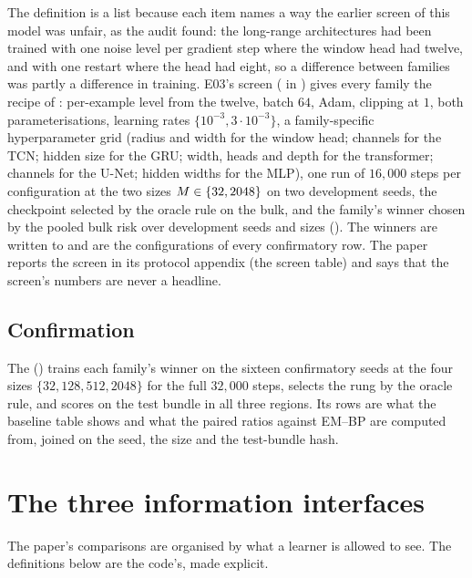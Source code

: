 The definition is a list because each item names a way the earlier screen of this
model was unfair, as the audit found: the long-range architectures had been trained with
one noise level per gradient step where the window head had twelve, and with one
restart where the head had eight, so a difference between families was partly a
difference in training. E03's screen ( in
) gives every family the recipe of
: per-example level from the twelve, batch $64$, Adam,
clipping at $1$, both parameterisations, learning rates $\{10^{-3},3\cdot10^{-3}\}$, a
family-specific hyperparameter grid (radius and width for the window head; channels for
the TCN; hidden size for the GRU; width, heads and depth for the transformer; channels
for the U-Net; hidden widths for the MLP), one run of $16{,}000$ steps per configuration
at the two sizes $M\in\{32,2048\}$ on two development seeds, the checkpoint selected
by the oracle rule on the bulk, and the family's winner chosen by the pooled bulk risk
over development seeds and sizes (). The winners are
written to  and are the configurations of every
confirmatory row. The paper reports the screen in its protocol appendix (the screen
table) and says that the screen's numbers are never a headline.

\subsection{Confirmation}

The  () trains each family's winner on the
sixteen confirmatory seeds at the four sizes $\{32,128,512,2048\}$ for the full
$32{,}000$ steps, selects the rung by the oracle rule, and scores on the test bundle in
all three regions. Its rows are what the baseline table shows and what the paired
ratios against EM--BP are computed from, joined on the seed, the size and the test-bundle
hash.

\section{The three information interfaces}
\label{sec:interfaces}

The paper's comparisons are organised by what a learner is allowed to see. The
definitions below are the code's, made explicit.

